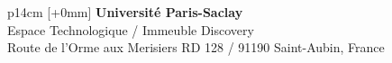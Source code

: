\documentclass[12pt,a4paper]{reedthesis}
\begin{document}
\vfill
{}\selectfont
\noindent\begin{tabular}{p{14cm}}
[+0mm]{\small {\color{Prune} {\bf Université Paris-Saclay}\\
{\scriptsize Espace Technologique / Immeuble Discovery}\\
{\scriptsize  Route de l’Orme aux Merisiers RD 128 / 91190 Saint-Aubin, France}}}\\\mbox{}
\end{tabular}


\end{document}
